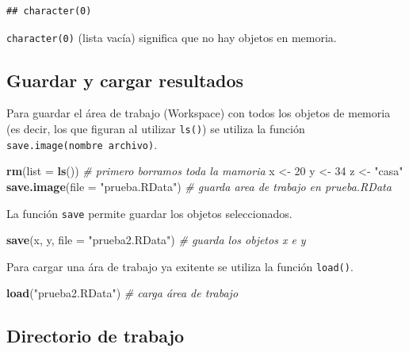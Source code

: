 \documentclass[]{book}
\newenvironment{Shaded}{\begin{snugshade}}{\end{snugshade}}
\newcommand{\CommentTok}[1]{\textcolor[rgb]{0.56,0.35,0.01}{\textit{#1}}}
\newcommand{\DataTypeTok}[1]{\textcolor[rgb]{0.13,0.29,0.53}{#1}}
\newcommand{\DecValTok}[1]{\textcolor[rgb]{0.00,0.00,0.81}{#1}}
\newcommand{\KeywordTok}[1]{\textcolor[rgb]{0.13,0.29,0.53}{\textbf{#1}}}
\newcommand{\NormalTok}[1]{#1}
\newcommand{\StringTok}[1]{\textcolor[rgb]{0.31,0.60,0.02}{#1}}
\begin{document}
\begin{verbatim}
## character(0)
\end{verbatim}

\texttt{character(0)} (lista vacía) significa que no hay objetos en memoria.

\hypertarget{guardar-y-cargar-resultados}{%
\subsection{Guardar y cargar resultados}\label{guardar-y-cargar-resultados}}

Para guardar
el área de trabajo (Workspace) con todos los objetos de memoria (es
decir, los que figuran al utilizar \texttt{ls()}) se utiliza la función
\texttt{save.image(nombre\ archivo)}.

\begin{Shaded}
\begin{Highlighting}[]
\KeywordTok{rm}\NormalTok{(}\DataTypeTok{list =} \KeywordTok{ls}\NormalTok{()) }\CommentTok{# primero borramos toda la mamoria}
\NormalTok{x <-}\StringTok{ }\DecValTok{20}
\NormalTok{y <-}\StringTok{ }\DecValTok{34}
\NormalTok{z <-}\StringTok{ "casa"}
\KeywordTok{save.image}\NormalTok{(}\DataTypeTok{file =} \StringTok{"prueba.RData"}\NormalTok{) }\CommentTok{# guarda area de trabajo en prueba.RData}
\end{Highlighting}
\end{Shaded}

La función \texttt{save} permite guardar los objetos seleccionados.

\begin{Shaded}
\begin{Highlighting}[]
\KeywordTok{save}\NormalTok{(x, y, }\DataTypeTok{file =} \StringTok{"prueba2.RData"}\NormalTok{) }\CommentTok{# guarda los objetos x e y}
\end{Highlighting}
\end{Shaded}

Para cargar una ára de trabajo ya exitente se utiliza la función
\texttt{load()}.

\begin{Shaded}
\begin{Highlighting}[]
\KeywordTok{load}\NormalTok{(}\StringTok{"prueba2.RData"}\NormalTok{) }\CommentTok{# carga área de trabajo}
\end{Highlighting}
\end{Shaded}

\hypertarget{directorio-de-trabajo}{%
\subsection{Directorio de trabajo}\label{directorio-de-trabajo}}
\end{document}

